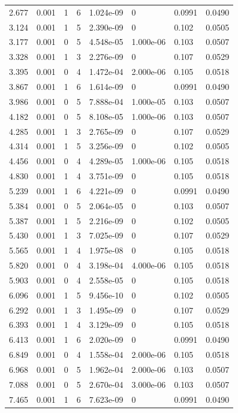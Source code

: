 \documentclass[preview]{standalone}
\begin{document}
{{\begin{tabular}{L{1.2cm}C{1.2cm} C{0.3cm}C{0.5cm} C{1.4cm}C{1.4cm} C{1.4cm}C{1.4cm}}
  2.677  &  0.001  & 1     &  6 &  1.024e-09  & 0  & 0.0991 &  0.0490   \\ 
  3.124  &  0.001  & 1     &  5 &  2.390e-09  & 0  & 0.102 &  0.0505   \\ 
  3.177  &  0.001  & 0     &  5 &  4.548e-05  & 1.000e-06  & 0.103 &  0.0507   \\ 
  3.328  &  0.001  & 1     &  3 &  2.276e-09  & 0  & 0.107 &  0.0529   \\ 
  3.395  &  0.001  & 0     &  4 &  1.472e-04  & 2.000e-06  & 0.105 &  0.0518   \\ 
  3.867  &  0.001  & 1     &  6 &  1.614e-09  & 0  & 0.0991 &  0.0490   \\ 
  3.986  &  0.001  & 0     &  5 &  7.888e-04  & 1.000e-05  & 0.103 &  0.0507   \\ 
  4.182  &  0.001  & 0     &  5 &  8.108e-05  & 1.000e-06  & 0.103 &  0.0507   \\ 
  4.285  &  0.001  & 1     &  3 &  2.765e-09  & 0  & 0.107 &  0.0529   \\ 
  4.314  &  0.001  & 1     &  5 &  3.256e-09  & 0  & 0.102 &  0.0505   \\ 
  4.456  &  0.001  & 0     &  4 &  4.289e-05  & 1.000e-06  & 0.105 &  0.0518   \\ 
  4.830  &  0.001  & 1     &  4 &  3.751e-09  & 0  & 0.105 &  0.0518   \\ 
  5.239  &  0.001  & 1     &  6 &  4.221e-09  & 0  & 0.0991 &  0.0490   \\ 
  5.384  &  0.001  & 0     &  5 &  2.064e-05  & 0  & 0.103 &  0.0507   \\ 
  5.387  &  0.001  & 1     &  5 &  2.216e-09  & 0  & 0.102 &  0.0505   \\ 
  5.430  &  0.001  & 1     &  3 &  7.025e-09  & 0  & 0.107 &  0.0529   \\ 
  5.565  &  0.001  & 1     &  4 &  1.975e-08  & 0  & 0.105 &  0.0518   \\ 
  5.820  &  0.001  & 0     &  4 &  3.198e-04  & 4.000e-06  & 0.105 &  0.0518   \\ 
  5.903  &  0.001  & 0     &  4 &  2.558e-05  & 0  & 0.105 &  0.0518   \\ 
  6.096  &  0.001  & 1     &  5 &  9.456e-10  & 0  & 0.102 &  0.0505   \\ 
  6.292  &  0.001  & 1     &  3 &  1.495e-09  & 0  & 0.107 &  0.0529   \\ 
  6.393  &  0.001  & 1     &  4 &  3.129e-09  & 0  & 0.105 &  0.0518   \\ 
  6.413  &  0.001  & 1     &  6 &  2.020e-09  & 0  & 0.0991 &  0.0490   \\ 
  6.849  &  0.001  & 0     &  4 &  1.558e-04  & 2.000e-06  & 0.105 &  0.0518   \\ 
  6.968  &  0.001  & 0     &  5 &  1.962e-04  & 2.000e-06  & 0.103 &  0.0507   \\ 
  7.088  &  0.001  & 0     &  5 &  2.670e-04  & 3.000e-06  & 0.103 &  0.0507   \\ 
  7.465  &  0.001  & 1     &  6 &  7.623e-09  & 0  & 0.0991 &  0.0490   \\ 
\hline 
\end{tabular} 

}}
\end{document}
